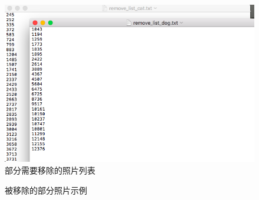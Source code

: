 \documentclass[a4paper,11pt]{article}
\begin{document}
\begin{figure}[htb]
\centering
\includegraphics[scale=0.4]{./figure/removelist.png}
\caption{部分需要移除的照片列表}
\label{fig:remove}
\end{figure}

\begin{figure}[htb]
\centering
{}
\caption{被移除的部分照片示例}
\label{fig:missfigure}
\end{figure}
\end{document}
